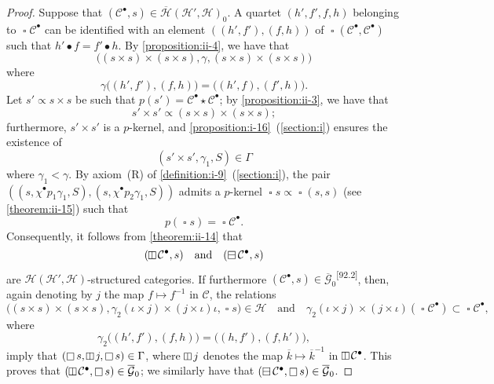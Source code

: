 \documentclass[a4paper,fleqn]{article}
\makeatletter
\theoremstyle{plain}
\theoremstyle{definition}
\def\blfootnote{\xdef\@thefnmark{}\@footnotetext}
\newcommand{\comm}[2]{{\normalfont\textsuperscript{[#1]}}\blfootnote{\label{footnote:#1}\textbf{[#1]} #2}}
\newcommand{\textand}{\quad\text{and}\quad}
\newcommand{\CC}{\mathcal{C}}
\newcommand{\HH}{\mathcal{H}}
\newcommand{\subs}{\mathrel{\propto}}
\newcommand{\GG}{\mathcal{G}}
\newcommand{\hsqbox}{{\boxminus}}
\newcommand{\vsqbox}{{\rotatebox{90}{$\boxminus$}}}
\DeclareMathOperator{\sq}{\square}
\DeclareMathOperator{\hsq}{\raisebox{-.05em}{$\hsqbox$}}
\DeclareMathOperator{\vsq}{\raisebox{-.1em}{$\vsqbox$}}
\makeatother
\begin{document}
\begin{proof}
  Suppose that $(\CC^\bullet,s)\in\overline{\HH}(\HH',\HH)_0$.
  A quartet $(h',f',f,h)$ belonging to $\sq\CC^\bullet$ can be identified with an element $((h',f'),(f,h))$ of $\sq(\CC^\bullet,\CC^\bullet)$ such that $h'\bullet f=f'\bullet h$.
  By \cref{proposition:ii-4}, we have that
  \[
    \big(
      (s\times s)\times(s\times s),
      \gamma,
      (s\times s)\times(s\times s)
    \big)
  \]
  where
  \[
    \gamma\big((h',f'),(f,h)\big)
    = \big((h',f),(f',h)\big).
  \]
  Let $s'\subs s\times s$ be such that $p(s')=\CC^\bullet\star\CC^\bullet$;
  by \cref{proposition:ii-3}, we have that
  \[
    s'\times s'
    \subs (s\times s)\times(s\times s);
  \]
  furthermore, $s'\times s'$ is a $p$-kernel, and \cref{proposition:i-16}~(\cref{section:i}) ensures the existence of
  \[
    (s'\times s',\gamma_1,S)
    \in\Gamma
  \]
  where $\gamma_1<\gamma$.
  By axiom~(R) of \cref{definition:i-9}~(\cref{section:i}), the pair $((s,\chi^\bullet p_1\gamma_1,S),(s,\chi^\bullet p_2\gamma_1,S))$ admits a $p$-kernel $\sq s\subs\sq(s,s)$ (see \cref{theorem:ii-15}) such that
  \[
    p(\sq s) = \sq\CC^\bullet.
  \]
  Consequently, it follows from \cref{theorem:ii-14} that
  \[
    (\vsq\CC^\bullet,s)
    \textand
    (\hsq\CC^\bullet,s)
  \]
  are $\HH(\HH',\HH)$-structured categories.
  If furthermore $(\CC^\bullet,s)\in\overline{\GG}_0$\comm{92.2}{$\overline{\GG}=\overline{\GG}(\HH,\HH)$ by definition.}, then, again denoting by $j$ the map $f\mapsto f^{-1}$ in $\CC$, the relations
  \[
    \big(
      (s\times s)\times(s\times s),
      \gamma_2(\iota\times j)\times(j\times\iota)\iota,
      \sq s
    \big)
    \in\HH
    \textand
    \gamma_2(\iota\times j)\times(j\times\iota)(\sq\CC^\bullet)
    \subset\sq\CC^\bullet,
  \]
  where
  \[
    \gamma_2\big((h',f'),(f,h)\big)
    = \big((h,f'),(f,h')\big),
  \]
  imply that $(\sq s,\vsq j,\sq s)\in\Gamma$, where $\vsq j$ denotes the map $\overline{k}\mapsto\overline{k}^{-1}$ in $\vsq\CC^\bullet$.
  This proves that $(\vsq\CC^\bullet,\sq s)\in\overline{\GG}_0$;
  we similarly have that $(\hsq\CC^\bullet,\sq s)\in\overline{\GG}_0$.


\end{proof}
\end{document}
